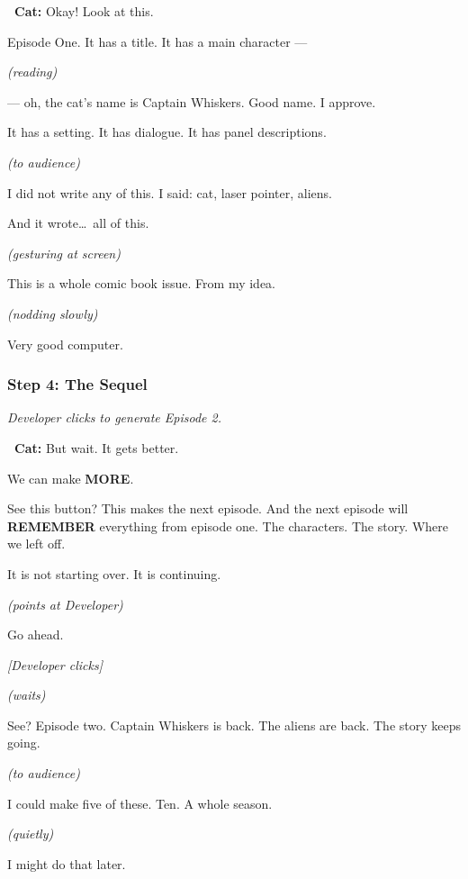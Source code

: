 \documentclass[12pt, letterpaper]{article}
\newcommand{\cat}{\textbf{\color{catpink}\faIcon{cat}\ Cat:}}
\newcommand{\stage}[1]{%
    \begin{stagebox}%
      \textit{\color{black!60}#1}%
    \end{stagebox}%
  }
\begin{document}
  \begin{catbox}
    \cat{} \large Okay! Look at this.

    \medskip
    {\large Episode One. It has a title. It has a main character —}

    \medskip
    {\large\textit{(reading)}}

    \medskip
    {\large — oh, the cat's name is Captain Whiskers. Good name. I approve.}

    \medskip
    {\large It has a setting. It has dialogue. It has panel descriptions.}

    \medskip
    {\large\textit{(to audience)}}

    \medskip
    {\large I did not write any of this. I said: cat, laser pointer, aliens.}

    \medskip
    {\large And it wrote\ldots\ all of this.}

    \medskip
    {\large\textit{(gesturing at screen)}}

    \medskip
    {\large This is a whole comic book issue. From my idea.}

    \medskip
    {\large\textit{(nodding slowly)}}

    \medskip
    {\large Very good computer.}
  \end{catbox}

  \subsubsection{Step 4: The Sequel}

  \stage{Developer clicks to generate Episode 2.}

  \begin{catbox}
    \cat{} \large But wait. It gets better.

    \medskip
    {\large We can make \textbf{MORE}.}

    \medskip
    {\large See this button? This makes the next episode. And the next episode will
    \textbf{REMEMBER} everything from episode one. The characters. The story. Where
    we left off.}

    \medskip
    {\large It is not starting over. It is continuing.}

    \medskip
    {\large\textit{(points at Developer)}}

    \medskip
    {\large Go ahead.}

    \medskip
    {\large\textit{[Developer clicks]}}

    \medskip
    {\large\textit{(waits)}}

    \medskip
    {\large See? Episode two. Captain Whiskers is back. The aliens are back. The
    story keeps going.}

    \medskip
    {\large\textit{(to audience)}}

    \medskip
    {\large I could make five of these. Ten. A whole season.}

    \medskip
    {\large\textit{(quietly)}}

    \medskip
    {\large I might do that later.}
  \end{catbox}
\end{document}
